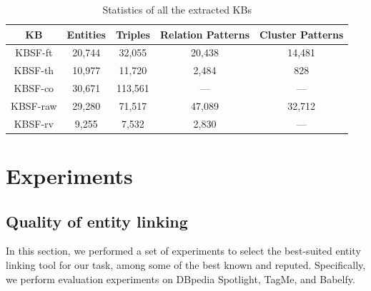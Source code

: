 \begin{table}[ht!]
\scriptsize
\centering
	\begin{tabular}{  c c c c c }
	\hline
	\textbf{KB} & \textbf{Entities} & \textbf{Triples} & \textbf{Relation Patterns} & \textbf{Cluster Patterns} \\
	\hline
	\textsc{KBSF}-ft & 20,744 & 32,055 & 20,438 & 14,481 \\
	\textsc{KBSF}-th & 10,977 & 11,720 & 2,484 & 828 \\
	\hline
	\textsc{KBSF}-co & 30,671 & 113,561 & --- & --- \\
	\textsc{KBSF}-raw & 29,280 & 71,517 & 47,089 & 32,712 \\
	\hline
	\textsc{KBSF}-rv & 9,255 & 7,532 & 2,830 & --- \\
	\hline
	\end{tabular}
	\caption{Statistics of all the extracted KBs}
	\label{tab:kbs}
\end{table}


\section{Experiments}
\label{sec:kb:experiments}

\subsection{Quality of entity linking}
\label{sec:kb:experiments:qualityentitylinking}

In this section, we performed a set of experiments to select the best-suited entity linking tool for our task, among some of the best known and reputed. Specifically, we perform evaluation experiments on DBpedia Spotlight, TagMe, and Babelfy. 



